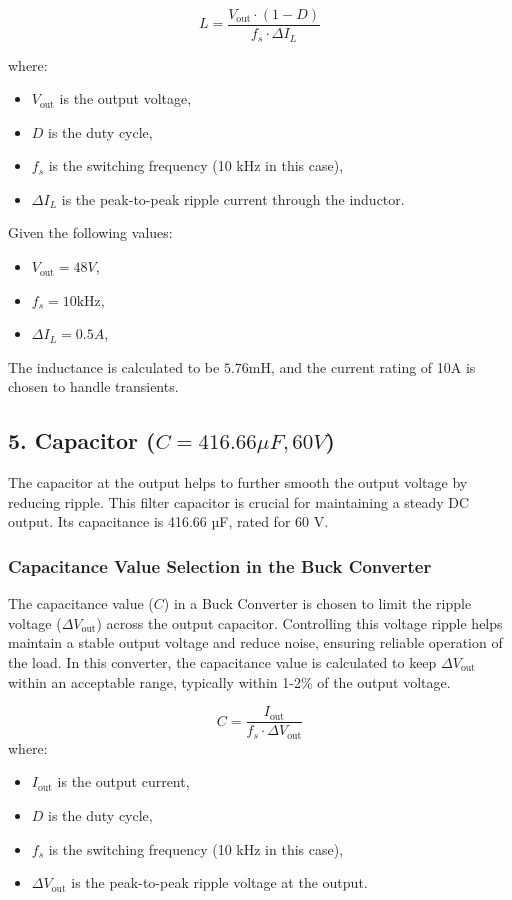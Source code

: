 \documentclass[12pt]{article}
\begin{document}
\[
L = \frac{V_{\text{out}} \cdot (1-D)}{f_s \cdot \Delta I_L}
\]

where:
\begin{itemize}
    \item \(V_{\text{out}}\) is the output voltage,
    \item \(D\) is the duty cycle,
    \item \(f_s\) is the switching frequency (10 kHz in this case),
    \item \(\Delta I_L\) is the peak-to-peak ripple current through the inductor.
\end{itemize}

Given the following values:
\begin{itemize}
    \item \(V_{\text{out}} = 48V\),
    \item \(f_s = 10 \text{kHz}\),
    \item \(\Delta I_L = 0.5A\),
\end{itemize}

The inductance is calculated to be \(5.76 \text{mH}\), and the current rating of 10A is chosen to handle transients.

\subsection*{5. Capacitor (\(C = 416.66\mu F, 60V\))}
The capacitor at the output helps to further smooth the output voltage by reducing ripple. This filter capacitor is crucial for maintaining a steady DC output. Its capacitance is 416.66 µF, rated for 60 V.

\subsubsection*{Capacitance Value Selection in the Buck Converter}
The capacitance value (\(C\)) in a Buck Converter is chosen to limit the ripple voltage (\(\Delta V_{\text{out}}\)) across the output capacitor. Controlling this voltage ripple helps maintain a stable output voltage and reduce noise, ensuring reliable operation of the load. In this converter, the capacitance value is calculated to keep \(\Delta V_{\text{out}}\) within an acceptable range, typically within 1-2\% of the output voltage.

\[
C = \frac{I_{\text{out}}}{f_s \cdot \Delta V_{\text{out}}}
\]
\newpage
where:
\begin{itemize}
    \item \(I_{\text{out}}\) is the output current,
    \item \(D\) is the duty cycle,
    \item \(f_s\) is the switching frequency (10 kHz in this case),
    \item \(\Delta V_{\text{out}}\) is the peak-to-peak ripple voltage at the output.
\end{itemize}
\end{document}
